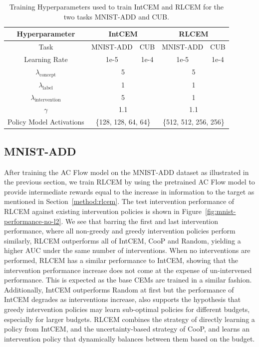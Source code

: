 \begin{table}[!ht]
    \centering
    \renewcommand{\arraystretch}{1.5}
    \begin{tabular}{c|cccc}
        Hyperparameter & \multicolumn{2}{c}{IntCEM} & \multicolumn{2}{c}{RLCEM} \\
        \hline
        Task & MNIST-ADD & CUB &
        MNIST-ADD & CUB \\ 
        Learning Rate & 1e-5 & 1e-4 & 1e-5 & 1e-4 \\
        \hline
        $\lambda_{\text{concept}}$ & \multicolumn{2}{c}{5} & \multicolumn{2}{c}{5}\\
        $\lambda_{\text{label}}$ & \multicolumn{2}{c}{1} & \multicolumn{2}{c}{1}\\
        $\lambda_{\text{intervention}}$ & \multicolumn{2}{c}{5} & \multicolumn{2}{c}{1}\\
        $\gamma$ & \multicolumn{2}{c}{1.1} & \multicolumn{2}{c}{1.1} \\
        Policy Model Activations & \multicolumn{2}{c}{\{128, 128, 64, 64\}}
        &  \multicolumn{2}{c}{\{512, 512, 256, 256\}} \\
    \end{tabular}
    \caption{Training Hyperparameters used to train IntCEM and RLCEM for the 
    two tasks MNIST-ADD and CUB. }
    \label{table:hyperparameters}
\end{table}

\subsection{MNIST-ADD}

After training the AC Flow model on the MNIST-ADD dataset 
as illustrated in the previous section, we train RLCEM by 
using the
pretrained AC Flow model to provide intermediate rewards equal to 
the increase in information to the target as mentioned in 
Section~\ref{method:rlcem}.
The test intervention performance of RLCEM against 
existing intervention policies is shown in
Figure~\ref{fig:mnist-performance-no-l2}.
We see that barring the first and last intervention performance,
where all non-greedy and greedy intervention policies perform similarly,
RLCEM outperforms all of IntCEM, CooP and Random, yielding a 
higher AUC under the same number of interventions.
When no interventions are performed, 
RLCEM has a similar performance to 
IntCEM, showing that the intervention performance
increase does not come at the expense of un-intervened performance.
This is expected as the base CEMs are trained 
in a similar fashion. Additionally, IntCEM outperforms Random
 at first but the performance of 
IntCEM degrades as interventions increase,
also supports the hypothesis that greedy intervention policies 
may learn
sub-optimal policies for different budgets, especially for larger
 budgets.
RLCEM combines the strategy of directly learning a policy from IntCEM,
and the uncertainty-based strategy of CooP, and learns an intervention policy
that dynamically balances between them based on the budget.

